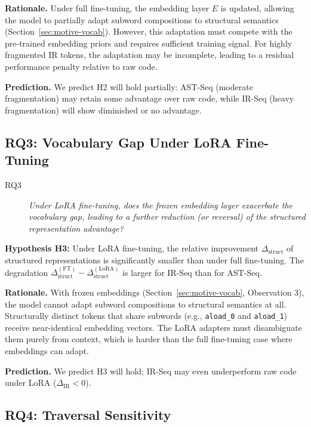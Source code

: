 \documentclass[pdflatex,sn-mathphys,Numbered]{sn-jnl}
\begin{document}
\textbf{Rationale.} Under full fine-tuning, the embedding layer $E$ is updated, allowing the model to partially adapt subword compositions to structural semantics (Section~\ref{sec:motive-vocab}). However, this adaptation must compete with the pre-trained embedding priors and requires sufficient training signal. For highly fragmented IR tokens, the adaptation may be incomplete, leading to a residual performance penalty relative to raw code.

\textbf{Prediction.} We predict H2 will hold partially: AST-Seq (moderate fragmentation) may retain some advantage over raw code, while IR-Seq (heavy fragmentation) will show diminished or no advantage.

\subsection{RQ3: Vocabulary Gap Under LoRA Fine-Tuning}

\begin{description}
\item[RQ3] \textit{Under LoRA fine-tuning, does the frozen embedding layer exacerbate the vocabulary gap, leading to a further reduction (or reversal) of the structured representation advantage?}
\end{description}

\textbf{Hypothesis H3:} Under LoRA fine-tuning, the relative improvement $\Delta_{\text{struct}}$ of structured representations is significantly smaller than under full fine-tuning. The degradation $\Delta_{\text{struct}}^{(\text{FT})} - \Delta_{\text{struct}}^{(\text{LoRA})}$ is larger for IR-Seq than for AST-Seq.

\textbf{Rationale.} With frozen embeddings (Section~\ref{sec:motive-vocab}, Observation 3), the model cannot adapt subword compositions to structural semantics at all. Structurally distinct tokens that share subwords (e.g., \texttt{aload\_0} and \texttt{aload\_1}) receive near-identical embedding vectors. The LoRA adapters must disambiguate them purely from context, which is harder than the full fine-tuning case where embeddings can adapt.

\textbf{Prediction.} We predict H3 will hold; IR-Seq may even underperform raw code under LoRA ($\Delta_{\text{IR}} < 0$).

\subsection{RQ4: Traversal Sensitivity}
\end{document}
